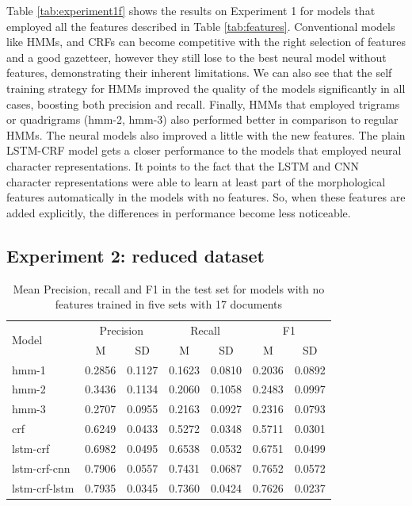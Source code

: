 \documentclass[sigconf]{acmart}
\begin{document}
Table \ref{tab:experiment1f} shows the results on Experiment 1 for models
that employed all the features described in Table \ref{tab:features}.
Conventional models like HMMs, and CRFs can become competitive with
the right selection of features and a good gazetteer, however they still lose
to the best neural model without features, demonstrating their inherent limitations.
We can also see that the self training strategy for HMMs improved the quality of 
the models significantly in all cases, boosting both precision and recall. Finally,
HMMs that employed trigrams or quadrigrams (hmm-2, hmm-3) also performed better in
comparison to regular HMMs.
The neural models also improved a little with the new features. The plain LSTM-CRF
model gets a closer performance to the models that employed neural character 
representations. It points to the fact that the LSTM and CNN character representations 
were able to learn at least part of the morphological features automatically in the
models with no features. So, when these features are added explicitly, the differences 
in performance become less noticeable.

\subsection{Experiment 2: reduced dataset}

\begin{table}[h]
  \small
  \begin{center}
    \begin{tabular}{ lllllll }
      \toprule
      \multirow{2}{*}{Model} & \multicolumn{2}{c}{Precision} & \multicolumn{2}{c}{Recall} & \multicolumn{2}{c}{F1} \\
                             & \multicolumn{1}{c}{\tiny{M}} & \multicolumn{1}{c}{\tiny{SD}}
			     & \multicolumn{1}{c}{\tiny{M}} & \multicolumn{1}{c}{\tiny{SD}}
			     & \multicolumn{1}{c}{\tiny{M}} & \multicolumn{1}{c}{\tiny{SD}} \\
      \midrule
      hmm-1	      & 0.2856 & 0.1127 & 0.1623 & 0.0810 & 0.2036 & 0.0892 \\
      hmm-2	      & 0.3436 & 0.1134 & 0.2060 & 0.1058 & 0.2483 & 0.0997 \\
      hmm-3	      & 0.2707 & 0.0955 & 0.2163 & 0.0927 & 0.2316 & 0.0793 \\
      crf	      & 0.6249 & 0.0433 & 0.5272 & 0.0348 & 0.5711 & 0.0301 \\
      lstm-crf	      & 0.6982 & 0.0495 & 0.6538 & 0.0532 & 0.6751 & 0.0499 \\
      lstm-crf-cnn    & 0.7906 & 0.0557 & 0.7431 & 0.0687 & 0.7652 & 0.0572 \\
      lstm-crf-lstm   & 0.7935 & 0.0345 & 0.7360 & 0.0424 & 0.7626 & 0.0237 \\
      \bottomrule
    \end{tabular}
  \end{center}
  \caption{Mean Precision, recall and F1 in the test set for models with no features
   trained in five sets with 17 documents}
  \label{tab:experiment2}
\end{table}
\end{document}
